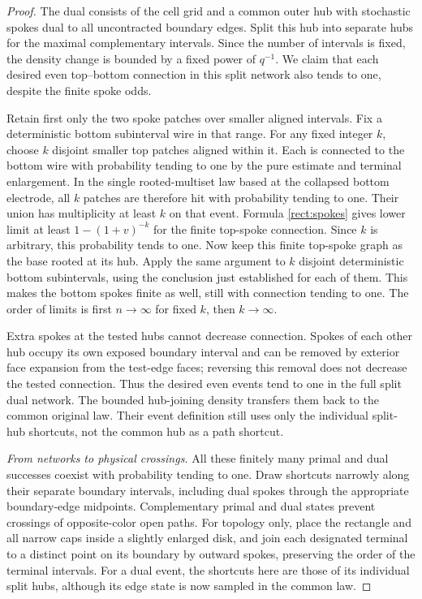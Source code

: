 \begin{proof}
The dual consists of the cell grid and a common outer hub with
stochastic spokes dual to all uncontracted boundary edges.  Split this
hub into separate hubs for the maximal complementary intervals.  Since
the number of intervals is fixed, the density change is bounded by a
fixed power of $q^{-1}$.  We claim that each desired even top--bottom
connection in this split network also tends to one, despite the finite
spoke odds.

Retain first only the two spoke patches over smaller aligned intervals.
Fix a deterministic bottom subinterval wire in that range.  For any
fixed integer $k$, choose $k$ disjoint smaller top patches aligned
within it.  Each is connected to the bottom wire with probability
tending to one by the pure estimate and terminal enlargement.  In the
single rooted-multiset law based at the collapsed bottom electrode,
all $k$ patches are therefore hit with probability tending to one.
Their union has multiplicity at least $k$ on that event.  Formula
\eqref{rect:spokes} gives lower limit at least $1-(1+v)^{-k}$ for the
finite top-spoke connection.  Since $k$ is arbitrary, this probability
tends to one.  Now keep this finite top-spoke graph as the base rooted
at its hub.  Apply the same argument to $k$ disjoint deterministic
bottom subintervals, using the conclusion just established for each
of them.  This makes the bottom spokes finite as well, still with
connection tending to one.  The order of limits is first $n\to\infty$
for fixed $k$, then $k\to\infty$.

Extra spokes at the tested hubs cannot decrease connection.  Spokes of
each other hub occupy its own exposed boundary interval and can be
removed by exterior face expansion from the test-edge faces; reversing
this removal does not decrease the tested connection.  Thus the desired even
events tend to one in the full split dual network.  The bounded
hub-joining density transfers them back to the common original law.
Their event definition still uses only the individual split-hub
shortcuts, not the common hub as a path shortcut.

\smallskip\noindent
\emph{From networks to physical crossings.}
All these finitely many primal and dual successes coexist with
probability tending to one.  Draw shortcuts narrowly along their
separate boundary intervals, including dual spokes through the
appropriate boundary-edge midpoints.  Complementary primal and dual
states prevent crossings of opposite-color open paths. For topology
only, place the rectangle and all narrow caps inside a slightly enlarged
disk, and join each designated terminal to a distinct point on its
boundary by outward spokes, preserving the order of the terminal intervals.
For a dual event, the shortcuts here are those of its individual
split hubs, although its edge state is now sampled in the common law.


\end{proof}

